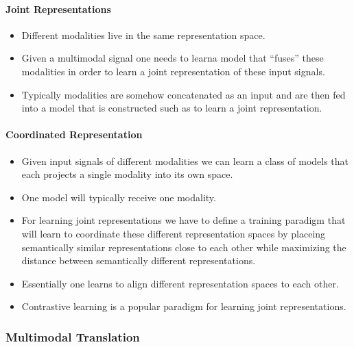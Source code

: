 \documentclass[
]{krantz}
\providecommand{\tightlist}{%
  \setlength{\itemsep}{0pt}\setlength{\parskip}{0pt}}
\begin{document}
\hypertarget{joint-representations}{%
\paragraph{Joint Representations}\label{joint-representations}}

\begin{itemize}
\tightlist
\item
  Different modalities live in the same representation space.
\item
  Given a multimodal signal one needs to learna model that ``fuses'' these modalities in order to learn a joint representation of these input signals.
\item
  Typically modalities are somehow concatenated as an input and are then fed into a model that is constructed such as to learn a joint representation.
\end{itemize}

\hypertarget{coordinated-representation}{%
\paragraph{Coordinated Representation}\label{coordinated-representation}}

\begin{itemize}
\tightlist
\item
  Given input signals of different modalities we can learn a class of models that each projects a single modality into its own space.
\item
  One model will typically receive one modality.
\item
  For learning joint representations we have to define a training paradigm that will learn to coordinate these different representation spaces by placeing semantically similar representations close to each other while maximizing the distance between semantically different representations.
\item
  Essentially one learns to align different representation spaces to each other.
\item
  Contrastive learning is a popular paradigm for learning joint representations.
\end{itemize}

\hypertarget{multimodal-translation}{%
\subsubsection{Multimodal Translation}\label{multimodal-translation}}
\end{document}

